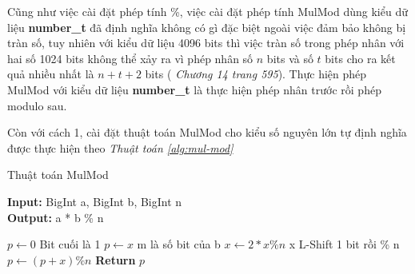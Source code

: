 Cũng như việc cài đặt phép tính \%, việc cài đặt phép tính MulMod dùng kiểu dữ liệu \textbf{number\_t} đã định nghĩa không có gì đặc biệt ngoài việc đảm bảo 
không bị tràn số, tuy nhiên với kiểu dữ liệu 4096 bits thì việc tràn số trong phép nhân với hai số 1024 bits không thể xảy ra vì phép nhân số $n$ bits và số $t$ bits 
cho ra kết quả nhiều nhất là $n + t + 2$ bits (\textit{\cite{Menezes} Chương 14 trang 595}). Thực hiện phép MulMod với kiểu dữ liệu \textbf{number\_t} là thực hiện phép nhân 
trước rồi phép modulo sau.

Còn với cách 1, cài đặt thuật toán MulMod cho kiểu số nguyên lớn tự định nghĩa được thực hiện theo \textit{Thuật toán \ref{alg:mul-mod}}

\begin{algorithm}
\caption{Thuật toán MulMod}\label{alg:mul-mod}
\hspace*{\algorithmicindent} \textbf{Input:} BigInt a, BigInt b, BigInt n\\
\hspace*{\algorithmicindent} \textbf{Output:} a * b \% n
\begin{algorithmic}[1]
\State $p \gets 0$
 \Comment Bit cuối là 1
\State $p \gets x$
\EndIf
{}\Comment m là số bit của b
\State $x \gets 2*x \%n$ \Comment x L-Shift 1 bit rồi \% n
\EndFor
{}
\State $p \gets (p+x) \%n$
\EndIf
\State \textbf{Return } $p$
\EndProcedure
\end{algorithmic}
\end{algorithm}